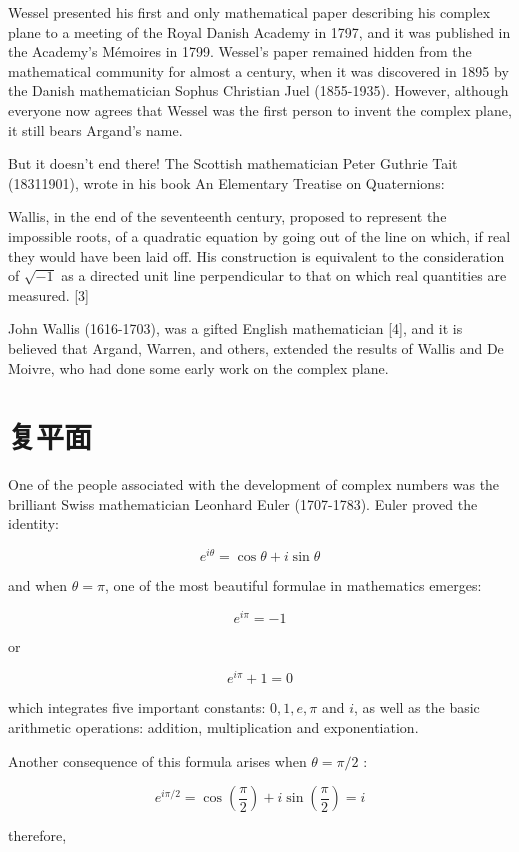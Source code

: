 Wessel presented his first and only mathematical paper describing his complex plane to a meeting of the Royal Danish Academy in 1797, and it was published in the Academy's Mémoires in 1799. Wessel's paper remained hidden from the mathematical community for almost a century, when it was discovered in 1895 by the Danish mathematician Sophus Christian Juel (1855-1935). However, although everyone now agrees that Wessel was the first person to invent the complex plane, it still bears Argand's name.

But it doesn't end there! The Scottish mathematician Peter Guthrie Tait (18311901), wrote in his book An Elementary Treatise on Quaternions:

Wallis, in the end of the seventeenth century, proposed to represent the impossible roots, of a quadratic equation by going out of the line on which, if real they would have been laid off. His construction is equivalent to the consideration of $\sqrt{-1}$ as a directed unit line perpendicular to that on which real quantities are measured. [3]

John Wallis (1616-1703), was a gifted English mathematician [4], and it is believed that Argand, Warren, and others, extended the results of Wallis and De Moivre, who had done some early work on the complex plane.

\section{复平面}
One of the people associated with the development of complex numbers was the brilliant Swiss mathematician Leonhard Euler (1707-1783). Euler proved the identity:

$$
    e^{i \theta}=\cos \theta+i \sin \theta
$$

and when $\theta=\pi$, one of the most beautiful formulae in mathematics emerges:

$$
    e^{i \pi}=-1
$$

or

$$
    e^{i \pi}+1=0
$$

which integrates five important constants: $0,1, e, \pi$ and $i$, as well as the basic arithmetic operations: addition, multiplication and exponentiation.

Another consequence of this formula arises when $\theta=\pi / 2$ :

$$
    e^{i \pi / 2}=\cos \left(\frac{\pi}{2}\right)+i \sin \left(\frac{\pi}{2}\right)=i
$$

therefore,

